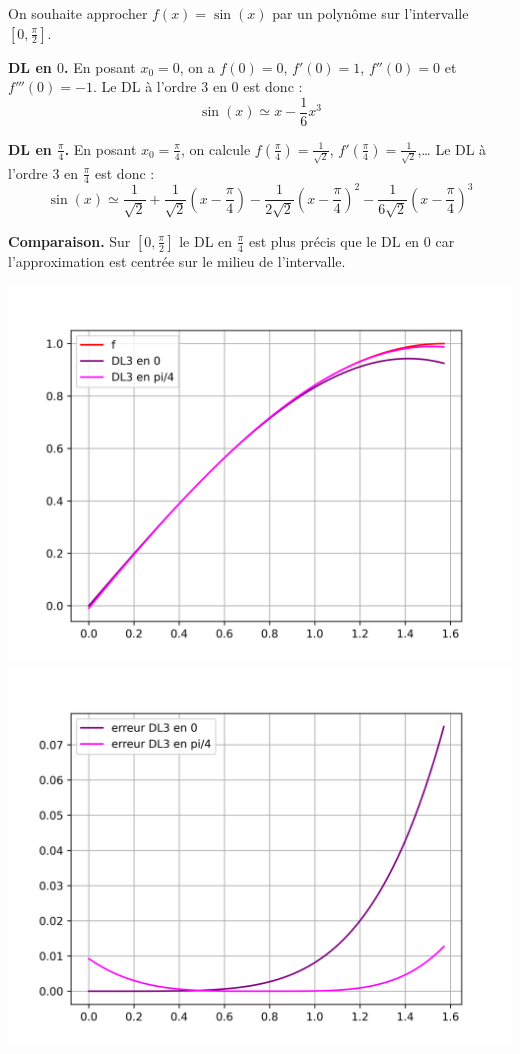 \documentclass[11pt,class=report,crop=false]{standalone}
\begin{document}
\begin{exemple}
On souhaite approcher $f(x) = \sin(x)$ par un polynôme sur l'intervalle $[0, \frac\pi2]$.

\textbf{DL en $0$.}
En posant $x_0 = 0$, on a $f(0) = 0$, $f'(0) = 1$, $f''(0) = 0$ et $f'''(0) = -1$.
Le DL à l'ordre $3$ en $0$ est donc :
$$\sin(x) \simeq x - \frac{1}{6}x^3$$

\textbf{DL en $\frac\pi4$.}
En posant $x_0 = \frac\pi4$, on calcule $f(\frac\pi4) = \frac{1}{\sqrt2}$, $f'(\frac\pi4) = \frac{1}{\sqrt2}$,\ldots
Le DL à l'ordre $3$ en $\frac\pi4$ est donc :
$$\sin(x) \simeq \frac{1}{\sqrt2} + \frac{1}{\sqrt2}\left(x-\frac\pi4\right) - \frac{1}{2\sqrt2}\left(x-\frac\pi4\right)^2 - \frac{1}{6\sqrt2}\left(x-\frac\pi4\right)^3$$

\textbf{Comparaison.}
Sur $[0,\frac\pi2]$ le DL en $\frac{\pi}{4}$ est plus précis que le DL en $0$ car l'approximation est centrée sur le milieu de l'intervalle.

\begin{center}
  \includegraphics[scale=\myscale,scale=0.5]{figures/approx-dl-03}
  \includegraphics[scale=\myscale,scale=0.5]{figures/approx-dl-04} 
\end{center}


\end{exemple}
\end{document}
